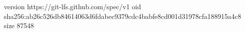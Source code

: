 version https://git-lfs.github.com/spec/v1
oid sha256:ab26c526db84614063d6fdabec9379cdc4babfe8cd001d31978cfa188915a4c8
size 87548
